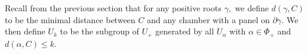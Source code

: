 \documentclass[class=book, crop=false]{standalone}
\begin{document}
%
%
Recall from the previous section that for any positive roots $\gamma,$ we define $d(\gamma,C)$ to be the minimal distance between $C$ and any chamber with a panel on $\partial\gamma.$ We then define $U_k$ to be the subgroup of $U_+$ generated by all $U_\alpha$ with $\alpha\in \Phi_+$ and $d(\alpha,C)\le k.$
\end{document}
